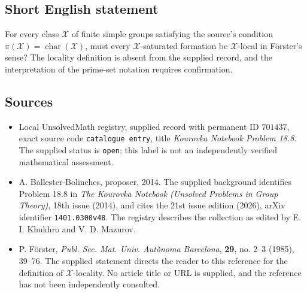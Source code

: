 \documentclass[11pt]{article}
\begin{document}
\subsection{Short English statement}
For every class \(\mathcal X\) of finite simple groups satisfying the source's condition \(\pi(\mathcal X)=\operatorname{char}(\mathcal X)\), must every \(\mathcal X\)-saturated formation be \(\mathcal X\)-local in F\"orster's sense? The locality definition is absent from the supplied record, and the interpretation of the prime-set notation requires confirmation.
\subsection{Sources}
\begin{itemize}
\item Local UnsolvedMath registry, supplied record with permanent ID \(701437\), exact source code \texttt{catalogue entry}, title \emph{Kourovka Notebook Problem 18.8}. The supplied status is \texttt{open}; this label is not an independently verified mathematical assessment.
\item A. Ballester-Bolinches, proposer, 2014. The supplied background identifies Problem 18.8 in \emph{The Kourovka Notebook (Unsolved Problems in Group Theory)}, 18th issue (2014), and cites the 21st issue edition (2026), arXiv identifier \texttt{1401.0300v48}. The registry describes the collection as edited by E. I. Khukhro and V. D. Mazurov.
\item P. F\"orster, \emph{Publ. Sec. Mat. Univ. Aut\`onoma Barcelona}, \textbf{29}, no. 2--3 (1985), 39--76. The supplied statement directs the reader to this reference for the definition of \(\mathcal X\)-locality. No article title or URL is supplied, and the reference has not been independently consulted.
\end{itemize}
\end{document}
